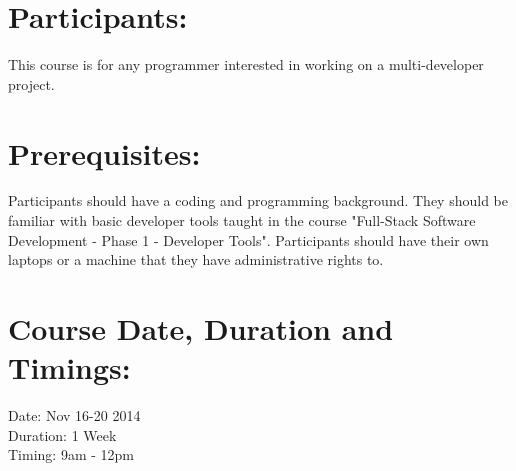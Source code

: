 \documentclass[a4paper,11pt]{article}
\begin{document}
\section{Participants:}
This course is for any programmer interested in working on a multi-developer project. 

\section{Prerequisites:}
Participants should have a coding and programming background. They should be familiar with basic developer tools taught in the course "Full-Stack Software Development - Phase 1 - Developer Tools". Participants should have their own laptops or a machine that they have administrative rights to.

\section{Course Date, Duration and Timings:}
Date: Nov 16-20 2014\\
Duration: 1 Week\\
Timing: 9am - 12pm
\end{document}
